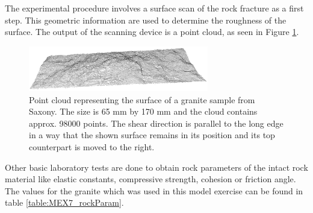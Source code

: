 The experimental procedure involves a surface scan of the rock fracture as a first step. This geometric information are used to determine the roughness of the surface. The output of the scanning device is a point cloud, as seen in Figure \ref{fig:MEX7_pointCloud}.

\begin{figure}[!ht]
\begin{center}
\includegraphics[width=0.7\textwidth]{./figures/MEX7_Point_cloud.png}
\end{center}
\caption{Point cloud representing the surface of a granite sample from Saxony. The size is 65 mm by 170 mm and the cloud contains approx. 98000 points. The shear direction is parallel to the long edge in a way that the shown surface remains in its position and its top counterpart is moved to the right.}
\label{fig:MEX7_pointCloud}
\end{figure}

Other basic laboratory tests are done to obtain rock parameters of the intact rock material like elastic constants, compressive strength, cohesion or friction angle. The values for the granite which was used in this model exercise can be found in table \ref{table:MEX7_rockParam}.


